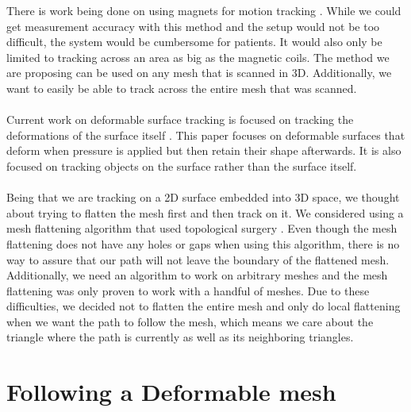 \documentclass[11pt,psfig]{article}
\begin{document}
There is work being done on using magnets for motion tracking \cite{magnetictracking}. While we could get measurement accuracy with this method and the setup would not be too difficult, the system would be cumbersome for patients. It would also only be limited to tracking across an area as big as the magnetic coils. The method we are proposing can be used on any mesh that is scanned in 3D. Additionally, we want to easily be able to track across the entire mesh that was scanned.\\
\\
Current work on deformable surface tracking is focused on tracking the deformations of the surface itself \cite{deformableobjecttracking,convexopt}. This paper focuses on deformable surfaces that deform when pressure is applied but then retain their shape afterwards. It is also focused on tracking objects on the surface rather than the surface itself.\\
\\
Being that we are tracking on a 2D surface embedded into 3D space, we thought about trying to flatten the mesh first and then track on it. We considered using a mesh flattening algorithm that used topological surgery \cite{meshunfolding}. Even though the mesh flattening does not have any holes or gaps when using this algorithm, there is no way to assure that our path will not leave the boundary of the flattened mesh. Additionally, we need an algorithm to work on arbitrary meshes and the mesh flattening was only proven to work with a handful of meshes. Due to these difficulties, we decided not to flatten the entire mesh and only do local flattening when we want the path to follow the mesh, which means we care about the triangle where the path is currently as well as its neighboring triangles. 

\section*{Following a Deformable mesh}
\end{document}
